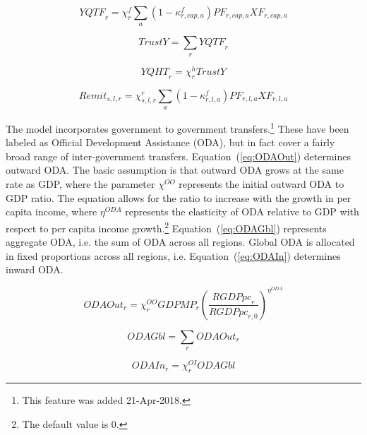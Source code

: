 \documentclass[11pt,letterpaper]{report}
\begin{document}
\begin{equation}
\label{eq:yqtf}
\mathit{YQTF}_r =
   \chi^f_r  \sum_a {
      \left( 1 - \kappa^f_{r,\mathit{cap},a} \right)
      \mathit{PF}_{r,\mathit{cap},a} \mathit{XF}_{r,\mathit{cap},a}
   }
\end{equation}

\begin{equation}
\label{eq:trustY}
\mathit{TrustY} = \sum_r {\mathit{YQTF}_r}
\end{equation}

\begin{equation}
\label{eq:yqht}
\mathit{YQHT}_r = \chi^h_r \mathit{TrustY}
\end{equation}

\begin{equation}
\label{eq:remit}
\mathit{Remit}_{s,l,r} =
   \chi^r_{s,l,r} \sum_a{
      \left( 1 - \kappa^f_{r,l,a} \right) \mathit{PF}_{r,l,a}
         \mathit{XF}_{r,l,a}
   }
\end{equation}

The model incorporates government to government transfers.\footnote{This
feature was added 21-Apr-2018.} These
have been labeled as Official Development Assistance (ODA), but in
fact cover a fairly broad range of inter-government transfers.
Equation~(\ref{eq:ODAOut}) determines outward ODA. The basic
assumption is that outward ODA grows at the same rate as GDP,
where the parameter $\chi^{OO}$ represents the initial outward ODA to GDP ratio.
The equation allows for the ratio to increase with the growth in per capita
income, where $\eta^{\mathit{ODA}}$ represents the elasticity of ODA relative to GDP
with respect to per capita income growth.\footnote{The default value is 0.}
Equation~(\ref{eq:ODAGbl}) represents aggregate ODA, i.e. the sum of ODA
across all regions. Global ODA is allocated in fixed proportions
across all regions, i.e. Equation~(\ref{eq:ODAIn}) determines inward ODA.

\begin{equation}
\label{eq:ODAOut}
\mathit{ODAOut}_r =
   \chi^{OO}_r \mathit{GDPMP}_r \left(\frac{\mathit{RGDPpc}_r}{\mathit{RGDPpc}_{r,0}}\right)^{\eta^{\mathit{ODA}}}
\end{equation}

\begin{equation}
\label{eq:ODAGbl}
\mathit{ODAGbl} = \sum_r {\mathit{ODAOut}_r}
\end{equation}

\begin{equation}
\label{eq:ODAIn}
\mathit{ODAIn}_r = \chi^{OI}_r \mathit{ODAGbl}
\end{equation}
\end{document}
